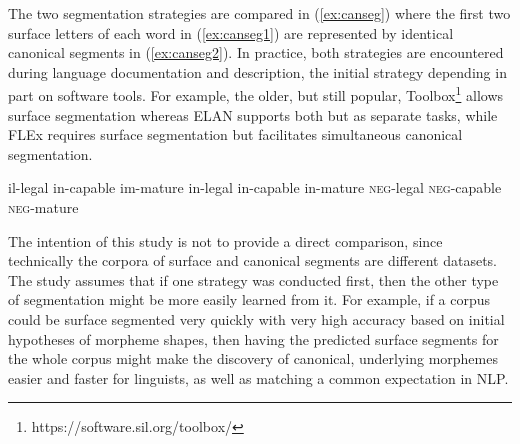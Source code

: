 The two segmentation strategies are compared in (\ref{ex:canseg}) where the first two surface letters of each word in (\ref{ex:canseg1}) are represented by identical canonical segments in (\ref{ex:canseg2}).%
In practice, both strategies are encountered during language documentation and description, the initial strategy depending in part on software tools. For example, the older, but still popular, Toolbox\footnote{https://software.sil.org/toolbox/} allows surface segmentation whereas ELAN \citep{auer_elan_2010} supports both but as separate tasks, while FLEx \citep{baines_overview_2018} requires surface segmentation but facilitates simultaneous canonical segmentation. 


\pex   
\label{ex:canseg}
\a il-legal \hspace{6mm} in-capable \hspace{5mm} im-mature
\label{ex:canseg1}
\a in-legal \hspace{5mm} in-capable \hspace{5mm} in-mature
\label{ex:canseg2}
\a \textsc{neg}-legal \hspace{1mm} \textsc{neg}-capable \hspace{1mm} \textsc{neg}-mature
\label{ex:canseg3}
\xe


The intention of this study is not to provide a direct comparison, since technically the corpora of surface and canonical segments are different datasets. The study assumes that if one strategy was conducted first, then the other type of segmentation might be more easily learned from it. For example, if a corpus could be surface segmented very quickly with very high accuracy based on initial hypotheses of morpheme shapes, then having the predicted surface segments for the whole corpus might make the discovery of canonical, underlying morphemes easier and faster for linguists, as well as matching a common expectation in NLP. 

